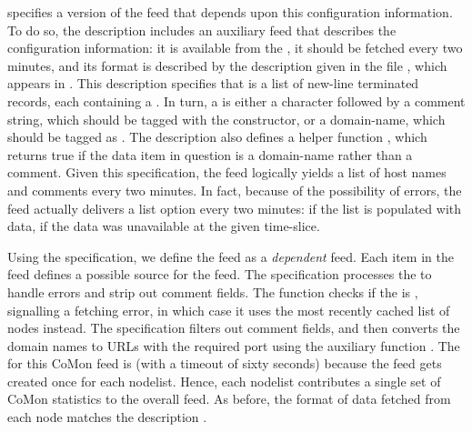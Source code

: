  specifies a version of the  feed that
depends upon this configuration information.  To do so, the
description includes an auxiliary feed  that describes the
configuration information: it is available from the
, it should be fetched every two minutes, and its
format is described by the \padsml{} description  given in
the file , which appears in .
This \padsml{} description specifies that  is a list of
new-line terminated records, each containing a .  In
turn, a  is either a  character followed by a
comment string, which should be tagged with the 
constructor, or a domain-name, which should be tagged as
. The description also defines a helper function ,
which returns true if the data item in question is a domain-name
rather than a comment.  Given this specification, the  feed
logically yields a list of host names and comments every two minutes.
In fact, because of the possibility of errors, the feed actually
delivers a list option every two minutes:  if the list is
populated with data,  if the data was unavailable at the
given time-slice.

Using the  specification, we define the  feed as a
\textit{dependent} feed.  Each item in the  feed defines a
possible source for the  feed.  The  
specification processes the  to handle errors and strip out
comment fields.  The  function checks if the 
is , signalling a fetching error, in which case it uses
the most recently cached list of nodes instead.  The 
specification filters out comment fields, and then converts the domain
names to URLs with the required port using the auxiliary function
.  The  for this CoMon feed is 
(with a timeout of sixty seconds) because the feed gets created once
for each nodelist.  Hence, each nodelist contributes a single set
of CoMon statistics to the overall  feed. As before, the
format of data fetched from each node matches the description
.







